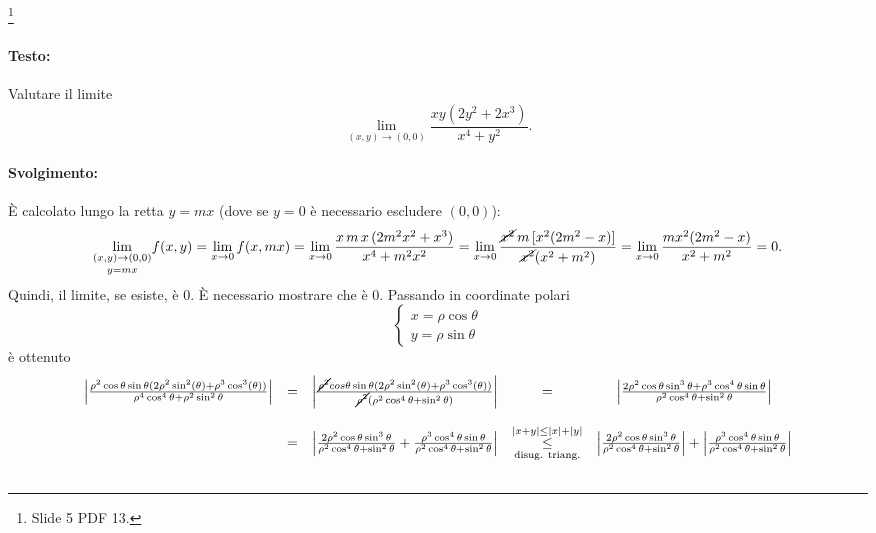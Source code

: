 \begin{example}\footnote{Slide 5 PDF 13.}
	\paragraph{Testo:} Valutare il limite
	\begin{equation*}
		\lim\limits_{(x,y)\rightarrow(0,0)} \frac{xy(2y^2 + 2 x^3)}{x^4+y^2}.
	\end{equation*}
	\paragraph{Svolgimento:} È calcolato lungo la retta $y=mx$ (dove se $y=0$ è necessario escludere $(0,0)$):
	\begin{equation*}
		\underset{y=mx}{\lim\limits_{(x,y)\rightarrow (0,0)}} f(x,y)=\lim\limits_{x\rightarrow 0}f(x,mx)=\lim\limits_{x\rightarrow 0} \frac{x\,m\,x\,(2m^2x^2+x^3)}{x^4+m^2x^2}=\lim\limits_{x\rightarrow 0}\frac{\cancel{x^2}\,m\, [x^2(2m^2-x)]}{\cancel{x^2}(x^2+m^2)} = \lim\limits_{x\rightarrow 0}\frac{mx^2(2m^2-x)}{x^2+m^2}=0.
	\end{equation*}
	Quindi, il limite, se esiste, è 0. È necessario mostrare che è 0. Passando in coordinate polari
	\begin{equation*}
		\begin{cases}
			x=\rho\cos\theta\\
			y=\rho\sin\theta
		\end{cases}
	\end{equation*}
	è ottenuto
	\begin{equation*}
		\begin{matrix}
			\left|\frac{\rho^2\cos\theta \sin\theta (2\rho^2\sin^2(\theta)+\rho^3\cos^3(\theta))}{\rho^4\cos^4\theta + \rho^2 \sin^2\theta}\right| &=& \left|\frac{\cancel{\rho^2}cos\theta \sin\theta (2\rho^2\sin^2(\theta)+\rho^3\cos^3(\theta))}{\cancel{\rho^2}(\rho^2\cos^4\theta + \sin^2\theta)}\right|&=& \left|\frac{2\rho^2\cos\theta\sin^3\theta + \rho^3 \cos^4\theta\sin\theta}{\rho^2 \cos^4\theta + \sin^2\theta}\right|\\\\
			&=& \left|\frac{2\rho^2\cos\theta\sin^3\theta}{\rho^2 \cos^4\theta + \sin^2\theta} + \frac{\rho^3 \cos^4\theta\sin\theta}{\rho^2 \cos^4\theta + \sin^2\theta}\right| &\overset{|x+y|\leq|x|+|y|}{\underset{\text{disug. triang.}}{\leq}}& \left|\frac{2\rho^2\cos\theta\sin^3\theta}{\rho^2 \cos^4\theta + \sin^2\theta}\right| + \left| \frac{\rho^3 \cos^4\theta\sin\theta}{\rho^2 \cos^4\theta + \sin^2\theta}\right|\\\\

\end{matrix}
\end{equation*}
\end{example}
